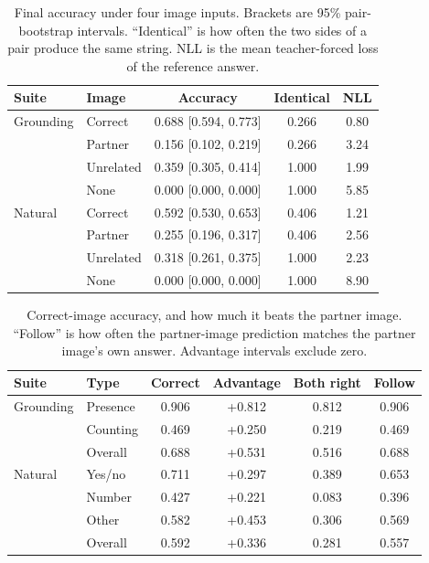 \documentclass[10pt]{article}
\begin{document}
\begin{table}[t]
\centering
\caption{Final accuracy under four image inputs. Brackets are 95\% pair-bootstrap intervals. ``Identical'' is how often the two sides of a pair produce the same string. NLL is the mean teacher-forced loss of the reference answer.}
\label{tab:vqa}
\scriptsize
\setlength{\tabcolsep}{2.6pt}
\begin{tabular}{llccc}
\toprule
Suite & Image & Accuracy & Identical & NLL \\
\midrule
Grounding & Correct & 0.688 [0.594, 0.773] & 0.266 & 0.80 \\
 & Partner & 0.156 [0.102, 0.219] & 0.266 & 3.24 \\
 & Unrelated & 0.359 [0.305, 0.414] & 1.000 & 1.99 \\
 & None & 0.000 [0.000, 0.000] & 1.000 & 5.85 \\
Natural & Correct & 0.592 [0.530, 0.653] & 0.406 & 1.21 \\
 & Partner & 0.255 [0.196, 0.317] & 0.406 & 2.56 \\
 & Unrelated & 0.318 [0.261, 0.375] & 1.000 & 2.23 \\
 & None & 0.000 [0.000, 0.000] & 1.000 & 8.90 \\
\bottomrule
\end{tabular}
\end{table}

\begin{table}[t]
\centering
\caption{Correct-image accuracy, and how much it beats the partner image. ``Follow'' is how often the partner-image prediction matches the partner image's own answer. Advantage intervals exclude zero.}
\label{tab:types}
\scriptsize
\setlength{\tabcolsep}{2.4pt}
\begin{tabular}{llcccc}
\toprule
Suite & Type & Correct & Advantage & Both right & Follow \\
\midrule
Grounding & Presence & 0.906 & +0.812 & 0.812 & 0.906 \\
 & Counting & 0.469 & +0.250 & 0.219 & 0.469 \\
 & Overall & 0.688 & +0.531 & 0.516 & 0.688 \\
Natural & Yes/no & 0.711 & +0.297 & 0.389 & 0.653 \\
 & Number & 0.427 & +0.221 & 0.083 & 0.396 \\
 & Other & 0.582 & +0.453 & 0.306 & 0.569 \\
 & Overall & 0.592 & +0.336 & 0.281 & 0.557 \\
\bottomrule
\end{tabular}
\end{table}
\end{document}
